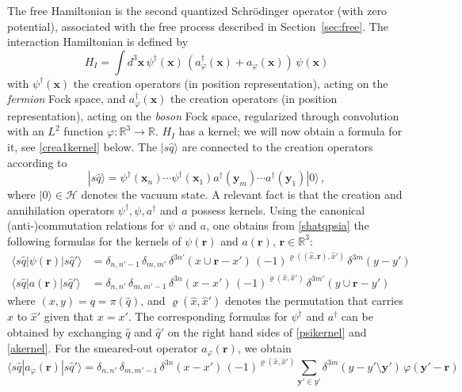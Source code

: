 \documentclass[12pt]{article}
\newcommand{\RRR}{\mathbb{R}} %
\newcommand{\1}{\mathbf{1}} %
\newcommand{\Hilbert}{\mathscr{H}}
\renewcommand{\sp}[2]{\langle #1 | #2 \rangle} %
\newcommand{\profile}{\varphi}
\newcommand{\covering}{\pi} %
\newcommand{\permutation}{\varrho} %
\newcommand{\vx}{{\boldsymbol x}} %
\newcommand{\vy}{{\boldsymbol y}}
\newcommand{\vr}{{\boldsymbol r}}
\newcommand{\inter}{{I}} %
\begin{document}
The free Hamiltonian is the second quantized Schr\"odinger operator
(with zero potential), associated with the free process described in
Section~\ref{sec:free}.  The interaction Hamiltonian is defined by
\begin{equation}\label{HIdef}
   H_\inter = \int d^3\vx \, \psi^\dag(\vx)\, (a^\dag_\profile(\vx) +
   a_{\profile}(\vx))\, \psi(\vx)
\end{equation}
with $\psi^\dag(\vx)$ the creation operators  (in position
representation), acting on the \emph{fermion} Fock space, and
$a^\dag_\profile(\vx)$ the creation operators  (in position
representation), acting on the \emph{boson} Fock space, regularized
through convolution with an $L^2$ function $\profile:\RRR^3 \to \RRR$.
$H_\inter$ has a kernel; we will now obtain a formula for it, see
\eqref{crea1kernel} below. The $|s\hat{q} \rangle$ are connected to
the creation operators according to
\begin{equation}\label{shatqpsia}
   |s\hat{q}\rangle = \psi^\dag(\vx_n) \cdots
    \psi^\dag(\vx_1) a^\dag(\vy_m) \cdots a^\dag(\vy_1) |0\rangle\,,
\end{equation}
where $|0\rangle \in \Hilbert$ denotes the vacuum state. A relevant
fact is that the creation and annihilation operators
$\psi^\dag,\psi,a^\dag$ and $a$ possess kernels. Using the canonical
(anti\nobreakdash-)commutation relations for $\psi$ and $a$, one obtains
from
\eqref{shatqpsia} the following formulas for the kernels of
$\psi(\vr)$ and $a(\vr)$, $\vr \in \RRR^3$:
\begin{align}
   \sp{s\hat{q}}{\psi(\vr)|s\hat{q}'} &= \delta_{n,n'-1} \,
   \delta_{m,m'} \,
   \delta^{3n'}(x \cup \vr -x') \, (-1)^{\permutation((\hat{x},
   \vr),\hat{x}')} \, \delta^{3m}(y-y') \label{psikernel} \\
   \sp{s\hat{q}}{a(\vr)|s\hat{q}'} &= \delta_{n,n'} \,
   \delta_{m,m'-1} \, \delta^{3n}(x-x') \,
   (-1)^{\permutation(\hat{x},\hat{x}')} \,
   \delta^{3m'}(y \cup \vr - y') \label{akernel}
\end{align}
where $(x,y) = q = \covering(\hat{q})$, and $\permutation
(\hat{x},\hat{x}')$ denotes the permutation that carries $\hat{x}$ to
$\hat{x}'$ given that $x=x'$. The corresponding formulas for
$\psi^\dag$ and $a^\dag$ can be obtained by exchanging $\hat{q}$ and
$\hat{q}'$ on the right hand sides of \eqref{psikernel} and
\eqref{akernel}.  For the smeared-out operator $a_\profile(\vr)$, we
obtain
\begin{equation}\label{aprofilekernel}
   \sp{s\hat{q}}{a_\profile(\vr)|s\hat{q}'} = \delta_{n,n'} \,
   \delta_{m,m'-1} \, \delta^{3n}(x-x') \,
   (-1)^{\permutation(\hat{x},\hat{x}')} \sum_{\vy' \in y'}
   \delta^{3m}(y- y'\setminus \vy') \, \profile(\vy' - \vr)
\end{equation}
\end{document}
